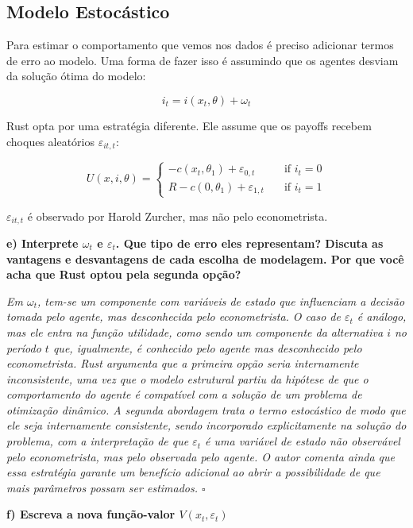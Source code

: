 \documentclass[12pt,a4paper]{article}
\begin{document}
\hypertarget{modelo-estocastico}{%
\subsection{Modelo Estocástico}\label{modelo-estocastico}}

Para estimar o comportamento que vemos nos dados é preciso adicionar
termos de erro ao modelo. Uma forma de fazer isso é assumindo que os
agentes desviam da solução ótima do modelo:

\[i_t = i(x_t, \theta) + \omega_t\]

Rust opta por uma estratégia diferente. Ele assume que os payoffs
recebem choques aleatórios \(\varepsilon_{it,t}\):

\[ U(x,i,\theta) = 
  \begin{cases}
    -c(x_t,\theta_1) + \varepsilon_{0,t}    & \quad \text{if } i_t=0\\
    R - c(0,\theta_1) + \varepsilon_{1,t}  & \quad \text{if } i_t=1
  \end{cases}
\]

\(\varepsilon_{it,t}\) é observado por Harold Zurcher, mas não pelo
econometrista.

\textbf{e) Interprete \(\omega_t\) e \(\varepsilon_t\). Que tipo de erro
eles representam? Discuta as vantagens e desvantagens de cada escolha de
modelagem. Por que você acha que Rust optou pela segunda opção?}

\emph{Em \(\omega_t\), tem-se um componente com variáveis de estado que
influenciam a decisão tomada pelo agente, mas desconhecida pelo
econometrista. O caso de \(\varepsilon_t\) é análogo, mas ele entra na
função utilidade, como sendo um componente da alternativa \(i\) no
período \(t\) que, igualmente, é conhecido pelo agente mas desconhecido
pelo econometrista. Rust argumenta que a primeira opção seria
internamente inconsistente, uma vez que o modelo estrutural partiu da
hipótese de que o comportamento do agente é compatível com a solução de
um problema de otimização dinâmico. A segunda abordagem trata o termo
estocástico de modo que ele seja internamente consistente, sendo
incorporado explicitamente na solução do problema, com a interpretação
de que \(\varepsilon_t\) é uma variável de estado não observável pelo
econometrista, mas pelo observada pelo agente. O autor comenta ainda que
essa estratégia garante um benefício adicional ao abrir a possibilidade
de que mais parâmetros possam ser estimados. \(\square\)}

\textbf{f) Escreva a nova função-valor \(V(x_t,\varepsilon_t)\)}
\end{document}

